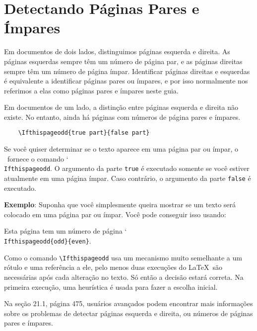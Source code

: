 \chapter{Detectando Páginas Pares e Ímpares}
Em documentos de dois lados, distinguimos páginas esquerda e direita. As páginas esquerdas sempre têm um número de página par, e as páginas direitas sempre têm um número de página ímpar. Identificar páginas direitas e esquerdas é equivalente a identificar páginas pares ou ímpares, e por isso normalmente nos referimos a elas como páginas pares e ímpares neste guia.

Em documentos de um lado, a distinção entre páginas esquerda e direita não existe. No entanto, ainda há páginas com números de página pares e ímpares.
\begin{verbatim}
    \Ifthispageodd{true part}{false part}
\end{verbatim}

Se você quiser determinar se o texto aparece em uma página par ou ímpar, o \KOMAScript\ fornece o comando \char`\\\texttt{If\-this\-page\-odd}. O argumento da parte \texttt{true} é executado somente se você estiver atualmente em uma página ímpar. Caso contrário, o argumento da parte \texttt{false} é executado.

\textbf{Exemplo}: Suponha que você simplesmente queira mostrar se um texto será colocado em uma página par ou ímpar. Você pode conseguir isso usando:

Esta página tem um número de página \char`\\\texttt{If\-this\-page\-odd\{odd\}\{even\}}.

Como o comando \verb|\Ifthispageodd| usa um mecanismo muito semelhante a um rótulo e uma referência a ele, pelo menos duas execuções do \LaTeX\ são necessárias após cada alteração no texto. Só então a decisão estará correta. Na primeira execução, uma heurística é usada para fazer a escolha inicial.

Na seção 21.1, página 475, usuários avançados podem encontrar mais informações sobre os problemas de detectar páginas esquerda e direita, ou números de páginas pares e ímpares.

